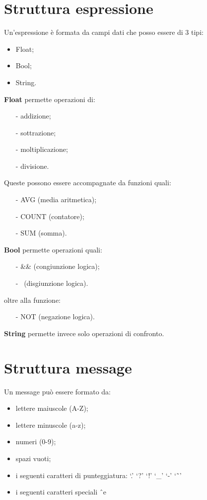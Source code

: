 \section{Struttura espressione}
Un'espressione \`e formata da campi dati che posso essere di 3 tipi:
\begin{itemize}
\item Float;
\item Bool;
\item String. 
\end{itemize}
\textbf{Float} permette operazioni di:
\begin{itemize}
\item[-] addizione;
\item[-] sottrazione;
\item[-] moltiplicazione;
\item[-] divisione.
\end{itemize}
Queste possono essere accompagnate da funzioni quali:
\begin{itemize}
\item[-] AVG (media aritmetica);
\item[-] COUNT (contatore);
\item[-] SUM (somma). 
\end{itemize}
\textbf{Bool} permette operazioni quali:
\begin{itemize}
\item[-] \&\& (congiunzione logica);
\item[-] \textbar\textbar\ (disgiunzione logica).
\end{itemize}
oltre alla funzione:
\begin{itemize}
\item[-] NOT (negazione logica). 
\end{itemize}
\textbf{String} permette invece solo operazioni di confronto.
\section{Struttura message}
Un message pu\`o essere formato da:
\begin{itemize}
\item lettere maiuscole (A-Z);
\item lettere minuscole (a-z);
\item numeri (0-9);
\item spazi vuoti;
\item i seguenti caratteri di punteggiatura: `.'  `?'  `!'  `\_'  `-'  `\~\ '
\item i seguenti caratteri speciali \^\ e \~ \\
\end{itemize}

